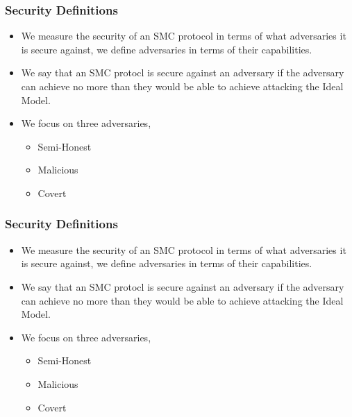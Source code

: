 \documentclass{beamer}
\begin{document}
	\begin{frame}
		\frametitle{Security Definitions}
		
		\begin{itemize}

		\item We measure the security of an SMC protocol in terms of what adversaries it is secure against, we define adversaries in terms of their capabilities.

		\item We say that an SMC protocl is secure against an adversary if the adversary can achieve no more than they would be able to achieve attacking the Ideal Model.

		\item We focus on three adversaries,
			\begin{itemize}
			\item Semi-Honest 
			\item Malicious 
			\item Covert
			\end{itemize}
		\end{itemize}

	\end{frame}
	\begin{frame}
		\frametitle{Security Definitions}
		
		\begin{itemize}

		\item We measure the security of an SMC protocol in terms of what adversaries it is secure against, we define adversaries in terms of their capabilities.

		\item We say that an SMC protocl is secure against an adversary if the adversary can achieve no more than they would be able to achieve attacking the Ideal Model.

		\item We focus on three adversaries,
			\begin{itemize}
				\item Semi-Honest 
				\item Malicious 
				\item Covert
			\end{itemize}
		\end{itemize}

	\end{frame}
	
\end{document}
